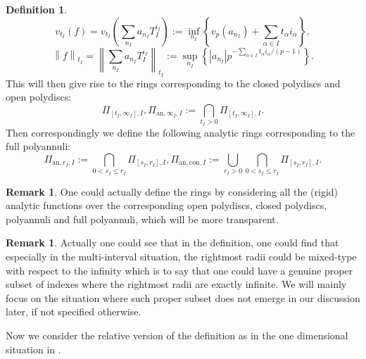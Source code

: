 \documentclass[12pt]{amsart}
\theoremstyle{definition}
\newtheorem{definition}[theorem]{Definition}
\newtheorem{remark}[theorem]{Remark}
\numberwithin{equation}{section}
\begin{document}
\begin{definition}
\begin{displaymath}
v_{t_I}(f)=v_{t_I}(\sum_{n_I}a_{n_I}T_I^{i_I}):= \inf_{n_I}\left\{v_p(a_{n_I})+\sum_{\alpha\in I}t_\alpha i_\alpha\right\},
\end{displaymath}
\begin{displaymath}
\left\|f\right\|_{t_I}=\left\|\sum_{n_I}a_{n_I}T_I^{i_I}\right\|_{t_I}:= \sup_{n_I}\left\{|a_{n_I}|p^{-\sum_{\alpha\in I}t_\alpha i_\alpha/(p-1)}\right\}.
\end{displaymath}
This will then give rise to the rings corresponding to the closed polydiscs and open polydiscs:
\begin{displaymath}
\Pi_{[t_I,\infty_I],I}, \Pi_{\mathrm{an},\infty_I,I}:=\bigcap_{t_I>0}\Pi_{[t_I,\infty_I],I}.	
\end{displaymath}
Then correspondingly we define the following analytic rings corresponding to the full polyannuli:
\begin{displaymath}
\Pi_{\mathrm{an},r_I,I}:=\bigcap_{0<s_I\leq r_I} \Pi_{[s_I,r_I],I},\Pi_{\mathrm{an},\mathrm{con},I}:=\bigcup_{r_I>0}\bigcap_{0<s_I\leq r_I} \Pi_{[s_I,r_I],I}. 
\end{displaymath}

\end{definition}


\begin{remark}
One could actually define the rings by considering all the (rigid) analytic functions over the corresponding open polydiscs, closed polydiscs, polyannuli and full polyannuli, which will be more transparent.
\end{remark}



\begin{remark}
Actually one could see that in the definition, one could find that especially in the multi-interval situation, the rightmost radii could be mixed-type with respect to the infinity which is to say that one could have a genuine proper subset of indexes where the rightmost radii are exactly infinite. We will mainly focus on the situation where such proper subset does not emerge in our discussion later, if not specified otherwise.	
\end{remark}



\indent Now we consider the relative version of the definition as in the one dimensional situation in \cite[Notation 2.1.1]{KPX}.
\end{document}
